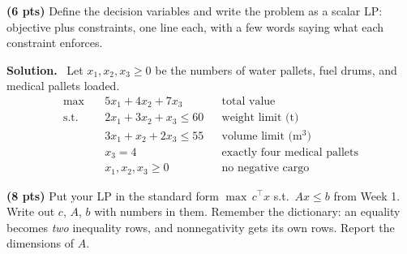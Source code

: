 \documentclass[10pt]{article}
\newenvironment{solution}
  {\par\smallskip\begingroup\color{solink}\textbf{Solution.}\ }
  {\endgroup\par}
\begin{document}
\begin{parts}
\item \textbf{(6 pts)} Define the decision variables and write the problem as a scalar
  LP: objective plus constraints, one line each, with a few words saying what each
  constraint enforces.

\begin{solution}
Let $x_1, x_2, x_3 \ge 0$ be the numbers of water pallets, fuel drums, and medical
pallets loaded.
\[
\begin{aligned}
  \max\quad & 5x_1 + 4x_2 + 7x_3 && \text{total value} \\
  \text{s.t.}\quad & 2x_1 + 3x_2 + x_3 \le 60 && \text{weight limit (t)} \\
                   & 3x_1 + x_2 + 2x_3 \le 55 && \text{volume limit (m$^3$)} \\
                   & x_3 = 4 && \text{exactly four medical pallets} \\
                   & x_1, x_2, x_3 \ge 0 && \text{no negative cargo}
\end{aligned}
\]
\end{solution}

\item \textbf{(8 pts)} Put your LP in the standard form
  $\max\, c^{\top}x$ s.t.\ $Ax \le b$ from Week 1. Write out $c$, $A$, $b$ with
  numbers in them. Remember the dictionary: an equality becomes \emph{two} inequality
  rows, and nonnegativity gets its own rows. Report the dimensions of $A$.


\end{parts}
\end{document}
